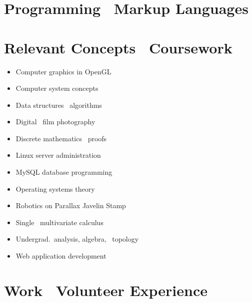 \documentclass{bcatresume}
\begin{document}
  \section{Programming \amp\ Markup Languages}

  \begin{keylist}
    \keyitem{\CPP}
    \keyitem{\CS}
    \keyitem{\FS}
    \keyitem{\LaTeX}
  \end{keylist}

  \newpage

  \section{Relevant Concepts \amp\ Coursework}

  \begin{multicols}{2}
    \begin{itemize}
      \item Computer graphics in OpenGL
      \item Computer system concepts
      \item Data structures \amp\ algorithms
      \item Digital \amp\ film photography
      \item Discrete mathematics \amp\ proofs
      \item Linux server administration
      \item MySQL database programming
      \item Operating systems theory
      \item Robotics on Parallax Javelin Stamp
      \item Single \amp\ multivariate calculus
      \item Undergrad.\ analysis, algebra, \amp\ topology
      \item Web application development
    \end{itemize}
  \end{multicols}

  \section{Work \amp\ Volunteer Experience}
\end{document}
